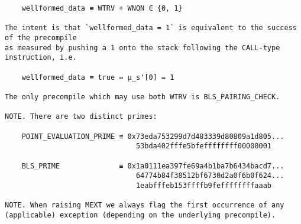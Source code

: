 \documentclass[varwidth=\maxdimen,margin=0.5cm,multi={verbatim}]{standalone}
\begin{document}
\begin{verbatim}
    wellformed_data ≡ WTRV + WNON ∈ {0, 1}

The intent is that `wellformed_data = 1` is equivalent to the success of the precompile
as measured by pushing a 1 onto the stack following the CALL-type instruction, i.e.

    wellformed_data ≡ true ⇔ μ_s'[0] = 1

The only precompile which may use both WTRV is BLS_PAIRING_CHECK.

NOTE. There are two distinct primes:

    POINT_EVALUATION_PRIME ≡ 0x73eda753299d7d483339d80809a1d805...
                               53bda402fffe5bfeffffffff00000001

    BLS_PRIME              ≡ 0x1a0111ea397fe69a4b1ba7b6434bacd7...
                               64774b84f38512bf6730d2a0f6b0f624...
                               1eabfffeb153ffffb9feffffffffaaab

NOTE. When raising MEXT we always flag the first occurrence of any (applicable) exception (depending on the underlying precompile).

\end{verbatim}
\end{document}
